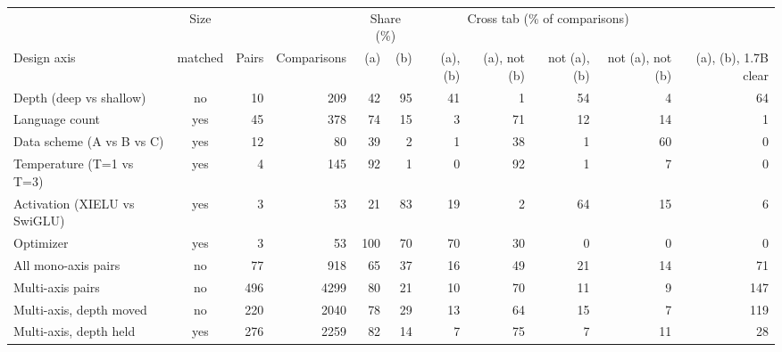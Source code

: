 \begin{tabular}{lcrrrrrrrrr}
\toprule
 & Size & & & \multicolumn{2}{c}{Share (\%)} & \multicolumn{4}{c}{Cross tab (\% of comparisons)} & \\
\cmidrule(lr){5-6}\cmidrule(lr){7-10}
Design axis & matched & Pairs & Comparisons & (a) & (b) & (a), (b) & (a), not (b) & not (a), (b) & not (a), not (b) & (a), (b), 1.7B clear \\
\midrule
Depth (deep vs shallow) & no & 10 & 209 & 42 & 95 & 41 & 1 & 54 & 4 & 64 \\
Language count & yes & 45 & 378 & 74 & 15 & 3 & 71 & 12 & 14 & 1 \\
Data scheme (A vs B vs C) & yes & 12 & 80 & 39 & 2 & 1 & 38 & 1 & 60 & 0 \\
Temperature (T=1 vs T=3) & yes & 4 & 145 & 92 & 1 & 0 & 92 & 1 & 7 & 0 \\
Activation (XIELU vs SwiGLU) & yes & 3 & 53 & 21 & 83 & 19 & 2 & 64 & 15 & 6 \\
Optimizer & yes & 3 & 53 & 100 & 70 & 70 & 30 & 0 & 0 & 0 \\
\midrule
All mono-axis pairs & no & 77 & 918 & 65 & 37 & 16 & 49 & 21 & 14 & 71 \\
\midrule
Multi-axis pairs & no & 496 & 4299 & 80 & 21 & 10 & 70 & 11 & 9 & 147 \\
Multi-axis, depth moved & no & 220 & 2040 & 78 & 29 & 13 & 64 & 15 & 7 & 119 \\
Multi-axis, depth held & yes & 276 & 2259 & 82 & 14 & 7 & 75 & 7 & 11 & 28 \\
\bottomrule
\end{tabular}
